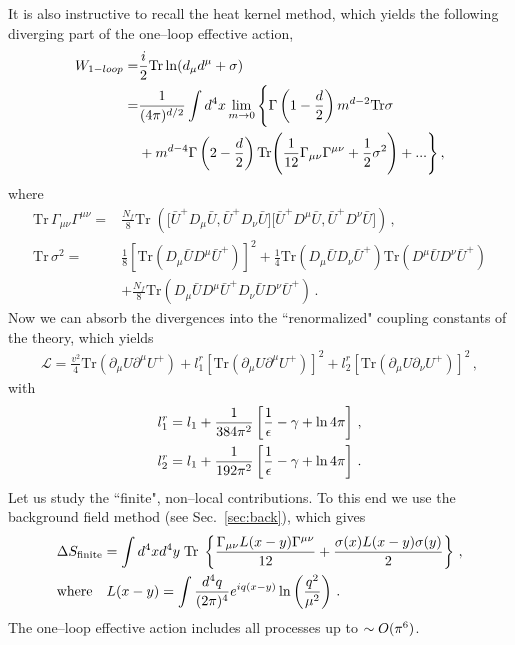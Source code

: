 \documentclass[12pt]{article}
\newcommand{\be}{\begin{equation}}
\newcommand{\ee}{\end{equation}}
\newcommand\m{\mu}
\newcommand\G{\Gamma}
\newcommand\n{\nu}
\newcommand\s{\sigma}
\def\d{\partial}
\renewcommand{\ln}{\mathop{\rm ln}\nolimits}
\begin{document}
It is also instructive to recall the heat kernel method, which yields the following diverging part of the
one--loop effective action,
\be
\begin{split}
W_{1-loop}=&\frac{i}{2}\text{Tr}\ln(d_\m d^\m+\sigma)\\
=&\frac{1}{(4\pi)^{d/2}}\int d^4x \lim_{m\to 0}\Bigg\{
\Gamma\left(1-\frac{d}{2}\right)m^{d-2}\text{Tr}\sigma\\
&+
m^{d-4}\Gamma\left(2-\frac{d}{2}\right)\text{Tr}\Bigg(\frac{1}{12}\G_{\m\n}\G^{\m\n}+\frac{1}{2}\sigma^2\Bigg)+...
\Bigg\}\,,
\end{split}
\ee
where
\be
\begin{split}
\text{Tr}\,\G_{\m\n}\G^{\m\n}=&\frac{N_f}{8}\text{Tr}\;\left(
\Bigg[\bar U^+D_\m \bar U,\bar U^+ D_\n \bar U\Bigg]
\Bigg[\bar U^+D^\m \bar U,\bar U^+ D^\n \bar U\Bigg]
\right)\,,\\
\text{Tr}\,\s^2 =&\frac{1}{8}\left[\text{Tr}\left(D_\m\bar U D^\m \bar U^+\right)\right]^2
+\frac{1}{4}\text{Tr}\left(D_\m \bar U D_\n \bar U^+\right)
\text{Tr}\left(D^\m \bar U D^\n \bar U^+\right)\\
&+\frac{N_f}{8}\text{Tr}(D_\m\bar U D^\m \bar U^+ D_\n \bar U D^\n \bar U^+)\,.
\end{split}
\ee
Now we can absorb the divergences into the ``renormalized" coupling constants of the theory,
which yields
\be
\begin{split}
\mathcal{L}=\frac{v^2}{4}\text{Tr}\left(\d_\m U \d^\m U^+\right)
+l^r_1[\text{Tr}\left(\d_\m U \d^\m U^+\right)]^2+l^r_2[\text{Tr}\left(\d_\m U \d_\n U^+\right)]^2\,,
\end{split}
\ee
with
\be
\begin{split}
& l_1^r=l_1+\frac{1}{384\pi^2}\left[\frac{1}{\epsilon}-\gamma+\ln 4\pi\right]\,,\\
& l_2^r=l_1+\frac{1}{192\pi^2}\left[\frac{1}{\epsilon}-\gamma+\ln 4\pi\right]\,.
\end{split}
\ee
Let us study the ``finite", non--local contributions.
To this end we use the background field method (see Sec.~\ref{sec:back}), which gives
\be
\begin{split}
&\Delta S_{\text{finite}}=\int d^4xd^4y \;\text{Tr}\;\left\{\frac{\G_{\m\n}L(x-y)\G^{\m\n}}{12}
+\frac{\s(x) L(x-y)\s(y)}{2}
\right\}\,,\\
&\text{where} \quad L(x-y)=\int \frac{d^4q}{(2\pi)^4}e^{iq(x-y)}\ln \left(\frac{q^2}{\mu^2}\right)\,.
\end{split}
\ee
The one--loop effective action includes all processes up to $\sim O({\bf \pi}^6)$.
\end{document}
